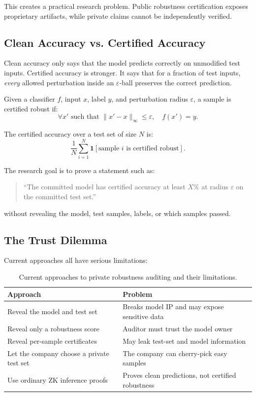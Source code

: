 \documentclass[11pt,a4paper]{article}
\begin{document}
This creates a practical research problem. Public robustness certification exposes proprietary artifacts, while private claims cannot be independently verified.

\subsection{Clean Accuracy vs. Certified Accuracy}

Clean accuracy only says that the model predicts correctly on unmodified test inputs. Certified accuracy is stronger. It says that for a fraction of test inputs, \textit{every} allowed perturbation inside an $\varepsilon$-ball preserves the correct prediction.

Given a classifier $f$, input $x$, label $y$, and perturbation radius $\varepsilon$, a sample is certified robust if:
\[
    \forall x' \text{ such that } \|x' - x\|_\infty \leq \varepsilon,\quad f(x') = y.
\]

The certified accuracy over a test set of size $N$ is:
\[
    \frac{1}{N}\sum_{i=1}^{N} \mathbf{1}[\text{sample } i \text{ is certified robust}].
\]

The research goal is to prove a statement such as:
\begin{quote}
``The committed model has certified accuracy at least $X\%$ at radius $\varepsilon$ on the committed test set.''
\end{quote}

without revealing the model, test samples, labels, or which samples passed.

\subsection{The Trust Dilemma}

Current approaches all have serious limitations:

\begin{table}[H]
\centering
\begin{tabular}{@{}p{4.1cm}p{8.6cm}@{}}
\toprule
\textbf{Approach} & \textbf{Problem} \\
\midrule
Reveal the model and test set & Breaks model IP and may expose sensitive data \\
Reveal only a robustness score & Auditor must trust the model owner \\
Reveal per-sample certificates & May leak test-set and model information \\
Let the company choose a private test set & The company can cherry-pick easy samples \\
Use ordinary ZK inference proofs & Proves clean predictions, not certified robustness \\
\bottomrule
\end{tabular}
\caption{Current approaches to private robustness auditing and their limitations.}
\end{table}
\end{document}
